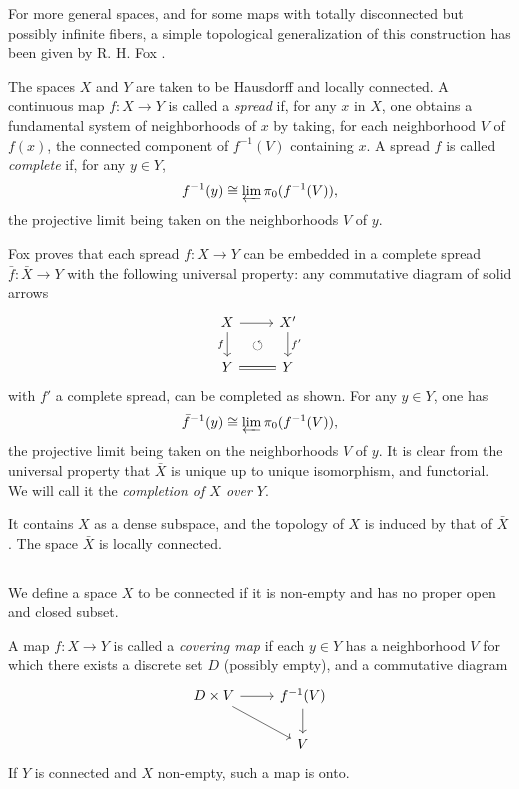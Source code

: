 \documentclass[12pt,a4paper]{article}
\theoremstyle{plain}
\theoremstyle{definition}
\theoremstyle{remark}
\numberwithin{equation}{section}
\begin{document}
For more general spaces, and for some maps with totally disconnected but possibly infinite fibers, a simple topological generalization of this construction has been given by R. H. Fox \cite{Fox}.

The spaces $X$ and $Y$ are taken to be Hausdorff and locally connected. A continuous map $f: X \to Y$ is called a \emph{spread} if, for any $x$ in $X$, one obtains a fundamental system of neighborhoods of $x$ by taking, for each neighborhood $V$ of $f(x)$, the connected component of $f^{-1}(V)$ containing $x$. A spread $f$ is called \emph{complete} if, for any $y \in Y$,
\[
f^{-1}(y) \cong \varprojlim \pi_0(f^{-1}(V)),
\]
the projective limit being taken on the neighborhoods $V$ of $y$.

Fox proves that each spread $f: X \to Y$ can be embedded in a complete spread $\bar{f}: \bar{X} \to Y$ with the following universal property: any commutative diagram of solid arrows
\[
\begin{tikzcd}
X \arrow[r] \arrow[d, "f"'] & X' \arrow[d, "f'"] \\
Y \arrow[r, equal] & Y \arrow[ul, phantom, "\circlearrowleft"]
\end{tikzcd}
\]
with $f'$ a complete spread, can be completed as shown. For any $y \in Y$, one has
\[
\bar{f}^{-1}(y) \cong \varprojlim \pi_0(f^{-1}(V)),
\]
the projective limit being taken on the neighborhoods $V$ of $y$. It is clear from the universal property that $\bar{X}$ is unique up to unique isomorphism, and functorial. We will call it the \emph{completion of $X$ over $Y$}.

It contains $X$ as a dense subspace, and the topology of $X$ is induced by that of $\bar{X}$. The space $\bar{X}$ is locally connected.

\subsection{}
We define a space $X$ to be connected if it is non-empty and has no proper open and closed subset.

A map $f: X \to Y$ is called a \emph{covering map} if each $y \in Y$ has a neighborhood $V$ for which there exists a discrete set $D$ (possibly empty), and a commutative diagram
\[
\begin{tikzcd}
D \times V \arrow[r] \arrow[dr] & f^{-1}(V) \arrow[d] \\ & V
\end{tikzcd}
\]
If $Y$ is connected and $X$ non-empty, such a map is onto.
\end{document}
